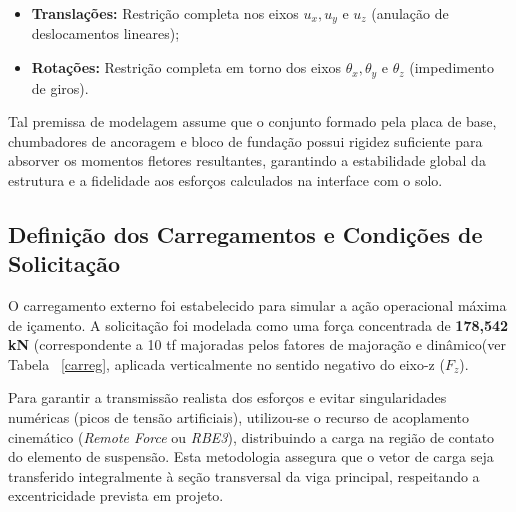 \documentclass[12pt, a4paper]{article}
\begin{document}
\begin{itemize}
    \item \textbf{Translações:} Restrição completa nos eixos $u_x, u_y$ e $u_z$ (anulação de deslocamentos lineares);
    \item \textbf{Rotações:} Restrição completa em torno dos eixos $\theta_x, \theta_y$ e $\theta_z$ (impedimento de giros).
\end{itemize}

Tal premissa de modelagem assume que o conjunto formado pela placa de base, chumbadores de ancoragem e bloco de fundação possui rigidez suficiente para absorver os momentos fletores resultantes, garantindo a estabilidade global da estrutura e a fidelidade aos esforços calculados na interface com o solo.

\subsection{Definição dos Carregamentos e Condições de Solicitação}

O carregamento externo foi estabelecido para simular a ação operacional máxima de içamento. A solicitação foi modelada como uma força concentrada de \textbf{178,542 kN} (correspondente a 10 tf majoradas pelos fatores de majoração e dinâmico(ver Tabela ~\ref{carreg}, aplicada verticalmente no sentido negativo do eixo-z ($F_z$).

Para garantir a transmissão realista dos esforços e evitar singularidades numéricas (picos de tensão artificiais), utilizou-se o recurso de acoplamento cinemático (\textit{Remote Force} ou \textit{RBE3}), distribuindo a carga na região de contato do elemento de suspensão. Esta metodologia assegura que o vetor de carga seja transferido integralmente à seção transversal da viga principal, respeitando a excentricidade prevista em projeto.
\end{document}
